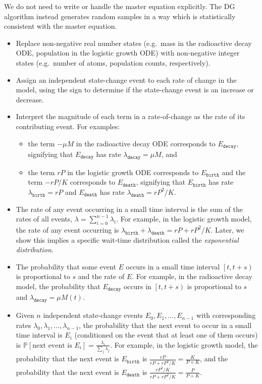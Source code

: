 We do not need to write or handle the master equation explicitly. The DG algorithm instead generates random samples in a way which is statistically consistent with the master equation.
\begin{itemize}
\item Replace non-negative real number states (e.g.\ mass in the radioactive decay ODE, population in the logistic growth ODE) with non-negative integer states (e.g.\ number of atoms, population counts, respectively).
\item Assign an independent state-change event to each rate of change in the model, using the sign to determine if the state-change event is an increase or decrease.
\item Interpret the magnitude of each term in a rate-of-change as the rate of its contributing event. For examples:
\begin{itemize}
      \item the term $- \mu M$ in the radioactive decay ODE corresponds to $E_{\texttt{decay}}$, signifying that $E_{\texttt{decay}}$ has rate $\lambda_{\texttt{decay}} = \mu M$, and
      \item the term $rP$ in the logistic growth ODE corresponds to $E_{\texttt{birth}}$ and the term $-rP/K$ corresponds to $E_{\texttt{death}}$, signifying that $E_{\texttt{birth}}$ has rate $\lambda_{\texttt{birth}} = rP$ and $E_{\texttt{death}}$ has rate $\lambda_{\texttt{death}} = rP^2/K$.
\end{itemize}
\item The rate of any event occurring in a small time interval is the sum of the rates of all events, $\lambda = \sum_{i=0}^{n-1} \lambda_i$. For example, in the logistic growth model, the rate of any event occurring is $\lambda_{\texttt{birth}} + \lambda_{\texttt{death}} = rP + rP^2/K$. Later, we show this implies a specific wait-time distribution called the \textit{exponential distribution}.
\item The probability that some event $E$ occurs in a small time interval $\left[t, t + s\right)$ is proportional to $s$ and the rate of $E$. For example, in the radioactive decay model, the probability that $E_{\texttt{decay}}$ occurs in $\left[t, t + s\right)$ is proportional to $s$ and $\lambda_{\texttt{decay}} = \mu M(t)$.
\item Given $n$ independent state-change events $E_0, E_1, \ldots, E_{n-1}$ with corresponding rates $\lambda_0, \lambda_1, \ldots, \lambda_{n-1}$, the probability that the next event to occur in a small time interval is $E_i$ (conditioned on the event that at least one of them occurs) is $\mathbb{P}\left[\text{next event is }E_i\right] = \frac{\lambda_i}{\sum_j \lambda_j}$. For example, in the logistic growth model, the probability that the next event is $E_{\texttt{birth}}$ is $\frac{rP}{rP + rP^2/K} = \frac{K}{P + K}$, and the probability that the next event is $E_{\texttt{death}}$ is $\frac{rP^2/K}{rP + rP^2/K} = \frac{P}{P + K}$.
\end{itemize}




